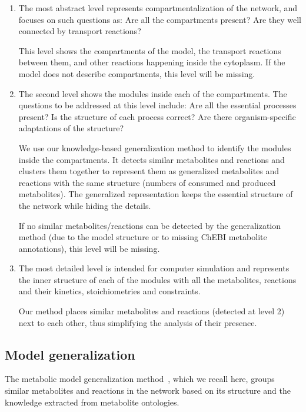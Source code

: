 \documentclass{bmcart}
\begin{document}
\begin{enumerate}
\item The most abstract level represents compartmentalization of the network, and focuses on such questions as: Are all the compartments present? Are they well connected by transport reactions?

This level shows the compartments of the model, the transport reactions between them, and other reactions happening inside the cytoplasm.
If the model does not describe compartments, this level will be missing.

\item The second level shows the modules inside each of the compartments. The questions to be addressed at this level include: Are all the essential processes present? Is the structure of each process correct? Are there organism-specific adaptations of the structure?

We use our knowledge-based generalization method to identify the modules inside the compartments. It detects similar metabolites and reactions and clusters them together to represent them as generalized metabolites and reactions with the same structure (numbers of consumed and produced metabolites). The generalized representation keeps the essential structure of the network while hiding the details.

If no similar metabolites/reactions can be detected by the generalization method (due to the model structure or to missing ChEBI metabolite annotations), this level will be missing.

\item The most detailed level is intended for computer simulation and represents the inner structure of each of the modules with all the metabolites, reactions and their kinetics, stoichiometries and constraints.

Our method places similar metabolites and reactions (detected at level 2) next to each other, thus simplifying the analysis of their presence.

\end{enumerate}

\subsection*{Model generalization}
The metabolic model generalization method~\cite{Zhukova2014}, which we recall here, groups similar metabolites and reactions in the network based on its structure and the knowledge extracted from metabolite ontologies. 
\end{document}
